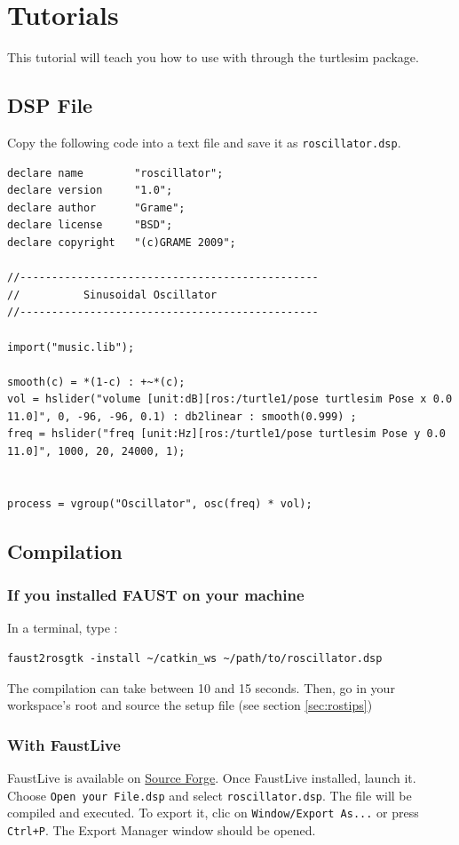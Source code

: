 \chapter{Tutorials}
\label{chap:tuto}
This tutorial will teach you how to use \faust with \ros through the turtlesim package.

\section{DSP File}
Copy the following code into a text file and save it as \lstinline'roscillator.dsp'.

\begin{lstlisting}
declare name 		"roscillator";
declare version 	"1.0";
declare author 		"Grame";
declare license 	"BSD";
declare copyright 	"(c)GRAME 2009";

//-----------------------------------------------
// 			Sinusoidal Oscillator
//-----------------------------------------------

import("music.lib");

smooth(c) = *(1-c) : +~*(c);
vol = hslider("volume [unit:dB][ros:/turtle1/pose turtlesim Pose x 0.0 11.0]", 0, -96, -96, 0.1) : db2linear : smooth(0.999) ;
freq = hslider("freq [unit:Hz][ros:/turtle1/pose turtlesim Pose y 0.0 11.0]", 1000, 20, 24000, 1);


process = vgroup("Oscillator", osc(freq) * vol);

\end{lstlisting}

\newpage

\section{Compilation}
\subsection{If you installed FAUST on your machine}
In a terminal, type :
\begin{lstlisting}
faust2rosgtk -install ~/catkin_ws ~/path/to/roscillator.dsp
\end{lstlisting}
The compilation can take between 10 and 15 seconds.
Then, go in your workspace's root and source the setup file (see section \ref{sec:rostips})

\subsection{With FaustLive}
FaustLive is available on \href{https://sourceforge.net/projects/faudiostream/files/}
{Source Forge}. Once FaustLive installed, launch it.\\
Choose \texttt{Open your File.dsp} and select \texttt{roscillator.dsp}. The file 
will be compiled and executed. 
To export it, clic on \texttt{Window/Export As...} or press \texttt{Ctrl+P}. The Export 
Manager window should be opened.

